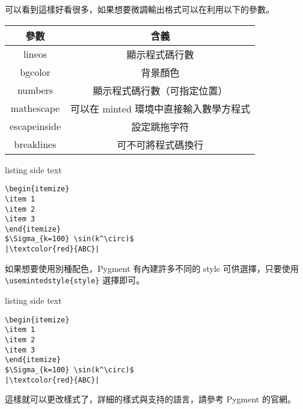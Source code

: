 可以看到這樣好看很多，如果想要微調輸出格式可以在利用以下的參數。

\begin{tabular}{cc}
參數 & 含義 \\\hline\hline
lineos & 顯示程式碼行數 \\\hline
bgcolor & 背景顏色 \\\hline
numbers & 顯示程式碼行數（可指定位置） \\\hline
mathescape & 可以在 minted 環境中直接輸入數學方程式 \\\hline
escapeinside & 設定跳拖字符 \\\hline
breaklines & 可不可將程式碼換行 \\\hline
\end{tabular}

\begin{tcblisting}{listing side text}
\begin{verbatim}
\begin{itemize}
\item 1
\item 2
\item 3
\end{itemize}
$\Sigma_{k=100} \sin(k^\circ)$
|\textcolor{red}{ABC}|
\end{verbatim}
\end{tcblisting}

如果想要使用別種配色，Pygment 有內建許多不同的 style 可供選擇，只要使用 \verb`\usemintedstyle{style}` 選擇即可。

\begin{tcblisting}{listing side text}
\begin{verbatim}
\begin{itemize}
\item 1
\item 2
\item 3
\end{itemize}
$\Sigma_{k=100} \sin(k^\circ)$
|\textcolor{red}{ABC}|
\end{verbatim}
\end{tcblisting}

這樣就可以更改樣式了，詳細的樣式與支持的語言，請參考 Pygment 的官網。
